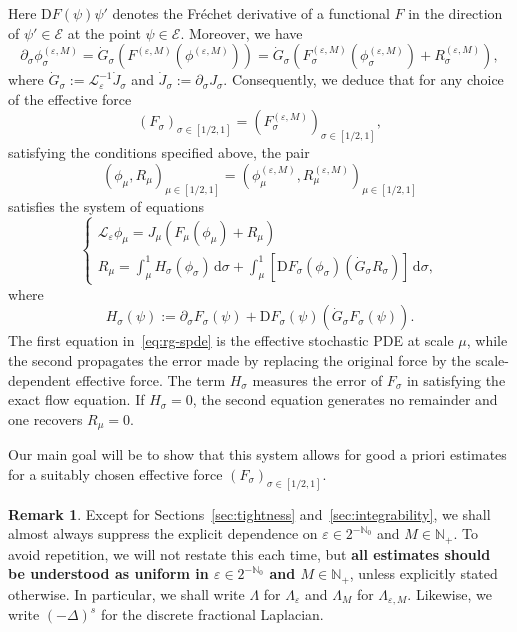 \documentclass{article}
\numberwithin{equation}{section}
\newcommand{\assign}{:=}
\newcommand{\mathD}{\mathrm{D}}
\newcommand{\mathd}{\mathrm{d}}
\theoremstyle{plain}
\theoremstyle{definition}
\newtheorem{remark}[theorem]{Remark}
\begin{document}
Here $\mathD F (\psi) \psi'$ denotes the Fr{\'e}chet derivative of a
functional $F $ in the direction of $\psi' \in \mathcal{E} $ at the point
$\psi \in \mathcal{E}$. Moreover, we have
\[ \partial_{\sigma} \phi^{(\varepsilon, M)}_{\sigma} = \dot{G}_{\sigma} 
   (F^{(\varepsilon, M)} (\phi^{(\varepsilon, M)})) = \dot{G}_{\sigma}
   (F^{(\varepsilon, M)}_{\sigma} (\phi^{(\varepsilon, M)}_{\sigma}) +
   R_{\sigma}^{(\varepsilon, M)}), \]
where $\dot{G}_{\sigma}  \assign \mathcal{L}^{- 1}_{\varepsilon}
\dot{J}_{\sigma}$ and $\dot{J}_{\sigma} \assign \partial_{\sigma} J_{\sigma}$.
Consequently, we deduce that for any choice of the effective force
\[ (F_{\sigma})_{\sigma \in [1 / 2, 1]} = (F_{\sigma}^{(\varepsilon,
   M)})_{\sigma \in [1 / 2, 1]}, \]
satisfying the conditions specified above, the pair
\[ (\phi_{\mu}, R_{\mu})_{\mu \in [1 / 2, 1]} = (\phi^{(\varepsilon,
   M)}_{\mu}, R^{(\varepsilon, M)}_{\mu})_{\mu \in [1 / 2, 1]} \]
satisfies the system of equations
\begin{equation}
  \left\{\begin{array}{l}
    \mathcal{L}_{\varepsilon} \phi _{\mu} = J_{\mu} (F _{\mu} (\phi _{\mu}) +
    R _{\mu})\\
    R_{\mu}  = \int_{\mu}^1 H_{\sigma}  (\phi _{\sigma})\,\mathd \sigma +
    \int_{\mu}^1 [\mathD F _{\sigma} (\phi _{\sigma})  (\dot{G}_{\sigma} 
    R_{\sigma})]\,\mathd \sigma,
  \end{array}\right. \text{} \label{eq:rg-spde}
\end{equation}
where
\begin{equation}
  H_{\sigma}  (\psi) \assign \partial_{\sigma} F _{\sigma} (\psi) + \mathD F
  _{\sigma} (\psi)  (\dot{G}_{\sigma}  F _{\sigma} (\psi)) . \label{eq:def-H}
\end{equation}
The first equation in~\eqref{eq:rg-spde} is the effective stochastic PDE at
scale $\mu$, while the second propagates the error made by replacing the
original force by the scale-dependent effective force. The term $H_{\sigma}$
measures the error of $F_{\sigma}$ in satisfying the exact flow equation. If
$H_{\sigma}=0$, the second equation generates no remainder and one recovers
$R_{\mu}=0$.

Our main goal will be to show that this system allows for good a priori
estimates for a suitably chosen effective force $(F_{\sigma} )_{\sigma \in [1
/ 2, 1]}$.

\begin{remark}
  Except for Sections~\ref{sec:tightness}
  and~\ref{sec:integrability}, we shall almost always suppress the explicit
  dependence on $\varepsilon \in 2^{-\mathbb{N}_0}$ and $M \in \mathbb{N}_+ .$
  To avoid repetition, we will not restate this each time, but \textbf{all
  estimates should be understood as uniform in $\varepsilon \in
  2^{-\mathbb{N}_0}$ and $M \in \mathbb{N}_+$}, unless explicitly stated
  otherwise. In particular, we shall write $\Lambda$ for
  $\Lambda_{\varepsilon}$ and $\Lambda_M$ for $\Lambda_{\varepsilon, M}$.
  Likewise, we write $(- \Delta)^s$ for the discrete fractional Laplacian.
\end{remark}
\end{document}
